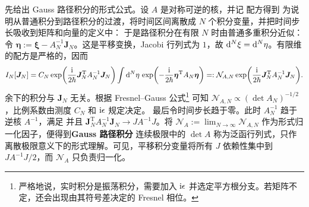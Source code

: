 先给出 Gauss 路径积分的形式公式。设 $A$ 是对称可逆的核，并记
配方得到
为说明从普通积分到路径积分的过渡，将时间区间离散成 $N$ 个积分变量，并把时间步长吸收到矩阵和向量的定义中：
于是路径积分在有限 $N$ 时由普通多重积分近似：
令 $\bm\eta:=\bm\xi-A_N^{-1}\bm J_N$。这是平移变换，Jacobi 行列式为 $1$，故 $\dd[N]{\xi}=\dd[N]{\eta}$。有限维的配方是严格的，因而
\[
    I_N[\bm J_N]
    =C_N\exp(\frac{\mathrm{i}}{2\hbar}
    \bm J_N^\mathrm T A_N^{-1}\bm J_N)
    \int\dd[N]{\eta}\,
    \exp(-\frac{\mathrm{i}}{2\hbar}\bm\eta^\mathrm T A_N\bm\eta)=:\mathcal N_{A,N}\exp(\frac{\mathrm{i}}{2\hbar}
    \bm J_N^\mathrm T A_N^{-1}\bm J_N).
\]
余下的积分与 $\bm J_N$ 无关。根据 Fresnel--Gauss 公式\footnote{严格地说，实时积分是振荡积分，需要加入 $\mathrm{i}\epsilon$ 并选定平方根分支。若矩阵不定，还会出现由其符号差决定的 Fresnel 相位。}
可知 $\mathcal N_{A,N}\propto(\det A_N)^{-1/2}$，比例系数由测度 $C_N$ 和 $\mathrm{i}\epsilon$ 规定决定。
最后令时间步长趋于零。此时 $A_N^{-1}$ 趋于逆核 $A^{-1}$，满足
并且 $\bm J_N^\mathrm T A_N^{-1}\bm J_N\to JA^{-1}J$。将 $\mathcal N_A:=\lim_{N\to\infty}\mathcal N_{A,N}$ 作为形式归一化因子，便得到\textbf{Gauss 路径积分}
连续极限中的 $\det A$ 称为泛函行列式，只作离散极限意义下的形式理解。可见，平移积分变量将所有 $J$ 依赖性集中到 $JA^{-1}J/2$，而 $\mathcal N_A$ 只负责归一化。

